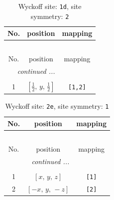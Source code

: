 \documentclass[fleqn,8pt]{jsarticle}
\begin{document}
\renewcommand{\arraystretch}{1.2}
\begin{longtable}{ccc}
\caption{Wyckoff site: {\tt 1d}, site symmetry: {\tt 2}}
 \\
 \hline \hline
No. & position & mapping \\ \hline \endfirsthead

\multicolumn{2}{l}{\tablename\ \thetable{}} \\
 \hline \hline
No. & position & mapping \\ \hline \endhead

 \hline \hline
\multicolumn{2}{r}{\footnotesize\it continued ...} \\ \endfoot

 \hline \hline
\multicolumn{2}{r}{} \\ \endlastfoot

1 & $\left[ \frac{1}{2},\, y,\, \frac{1}{2} \right]$ & {\tt [1,2]} \\
\end{longtable}
\renewcommand{\arraystretch}{1.2}
\begin{longtable}{ccc}
\caption{Wyckoff site: {\tt 2e}, site symmetry: {\tt 1}}
 \\
 \hline \hline
No. & position & mapping \\ \hline \endfirsthead

\multicolumn{2}{l}{\tablename\ \thetable{}} \\
 \hline \hline
No. & position & mapping \\ \hline \endhead

 \hline \hline
\multicolumn{2}{r}{\footnotesize\it continued ...} \\ \endfoot

 \hline \hline
\multicolumn{2}{r}{} \\ \endlastfoot

1 & $\left[ x,\, y,\, z \right]$ & {\tt [1]} \\ \hline
2 & $\left[ - x,\, y,\, - z \right]$ & {\tt [2]} \\
\end{longtable}
\end{document}
